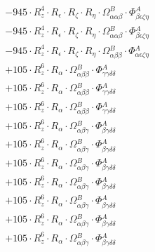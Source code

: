 \documentclass{article}
\begin{document}
\begin{subequations}
\begin{gather}
\begin{array}{c}
 \\[0.2em] 		 - 945 \cdot R_{z}^{4} \cdot R_{\epsilon{}} \cdot R_{\zeta{}} \cdot R_{\eta{}} \cdot \Omega{}^{B}_{\alpha{}\alpha{}\beta{}} \cdot \Phi{}^{A}_{\beta{}\epsilon{}\zeta{}\eta{}} 
 \\[0.2em] 		 - 945 \cdot R_{z}^{4} \cdot R_{\epsilon{}} \cdot R_{\zeta{}} \cdot R_{\eta{}} \cdot \Omega{}^{B}_{\alpha{}\alpha{}\beta{}} \cdot \Phi{}^{A}_{\beta{}\epsilon{}\zeta{}\eta{}} 
 \\[0.2em] 		 - 945 \cdot R_{z}^{4} \cdot R_{\epsilon{}} \cdot R_{\zeta{}} \cdot R_{\eta{}} \cdot \Omega{}^{B}_{\alpha{}\beta{}\beta{}} \cdot \Phi{}^{A}_{\alpha{}\epsilon{}\zeta{}\eta{}} 
 \\[0.2em] 		 + 105 \cdot R_{z}^{6} \cdot R_{\alpha{}} \cdot \Omega{}^{B}_{\alpha{}\beta{}\beta{}} \cdot \Phi{}^{A}_{\gamma{}\gamma{}\delta{}\delta{}} 
 \\[0.2em] 		 + 105 \cdot R_{z}^{6} \cdot R_{\alpha{}} \cdot \Omega{}^{B}_{\alpha{}\beta{}\beta{}} \cdot \Phi{}^{A}_{\gamma{}\gamma{}\delta{}\delta{}} 
 \\[0.2em] 		 + 105 \cdot R_{z}^{6} \cdot R_{\alpha{}} \cdot \Omega{}^{B}_{\alpha{}\beta{}\beta{}} \cdot \Phi{}^{A}_{\gamma{}\gamma{}\delta{}\delta{}} 
 \\[0.2em] 		 + 105 \cdot R_{z}^{6} \cdot R_{\alpha{}} \cdot \Omega{}^{B}_{\alpha{}\beta{}\gamma{}} \cdot \Phi{}^{A}_{\beta{}\gamma{}\delta{}\delta{}} 
 \\[0.2em] 		 + 105 \cdot R_{z}^{6} \cdot R_{\alpha{}} \cdot \Omega{}^{B}_{\alpha{}\beta{}\gamma{}} \cdot \Phi{}^{A}_{\beta{}\gamma{}\delta{}\delta{}} 
 \\[0.2em] 		 + 105 \cdot R_{z}^{6} \cdot R_{\alpha{}} \cdot \Omega{}^{B}_{\alpha{}\beta{}\gamma{}} \cdot \Phi{}^{A}_{\beta{}\gamma{}\delta{}\delta{}} 
 \\[0.2em] 		 + 105 \cdot R_{z}^{6} \cdot R_{\alpha{}} \cdot \Omega{}^{B}_{\alpha{}\beta{}\gamma{}} \cdot \Phi{}^{A}_{\beta{}\gamma{}\delta{}\delta{}} 
 \\[0.2em] 		 + 105 \cdot R_{z}^{6} \cdot R_{\alpha{}} \cdot \Omega{}^{B}_{\alpha{}\beta{}\gamma{}} \cdot \Phi{}^{A}_{\beta{}\gamma{}\delta{}\delta{}} 
 \\[0.2em] 		 + 105 \cdot R_{z}^{6} \cdot R_{\alpha{}} \cdot \Omega{}^{B}_{\alpha{}\beta{}\gamma{}} \cdot \Phi{}^{A}_{\beta{}\gamma{}\delta{}\delta{}} 
 \\[0.2em] 		 + 105 \cdot R_{z}^{6} \cdot R_{\alpha{}} \cdot \Omega{}^{B}_{\alpha{}\beta{}\gamma{}} \cdot \Phi{}^{A}_{\beta{}\gamma{}\delta{}\delta{}} 

\end{array}
\end{gather}
\end{subequations}
\end{document}
